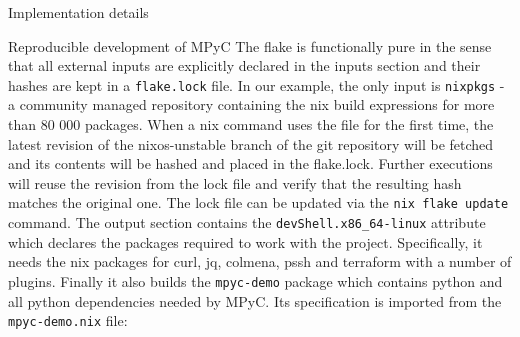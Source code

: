 \begin{frame}[fragile]{Implementation details}
\begin{block}{Reproducible development of MPyC}
The flake is functionally pure in the sense that all external inputs are
explicitly declared in the inputs section and their hashes are kept in a
\texttt{flake.lock} file. In our example, the only input is
\texttt{nixpkgs} - a community managed repository containing the nix
build expressions for more than 80 000 packages. When a nix command uses
the file for the first time, the latest revision of the nixos-unstable
branch of the git repository will be fetched and its contents will be
hashed and placed in the flake.lock. Further executions will reuse the
revision from the lock file and verify that the resulting hash matches
the original one. The lock file can be updated via the
\texttt{nix\ flake\ update} command. The output section contains the
\texttt{devShell.x86\_64-linux} attribute which declares the packages
required to work with the project. Specifically, it needs the nix
packages for curl, jq, colmena, pssh and terraform with a number of
plugins. Finally it also builds the \texttt{mpyc-demo} package which
contains python and all python dependencies needed by MPyC. Its
specification is imported from the \texttt{mpyc-demo.nix} file:

\newpage

\begin{Shaded}
\begin{Highlighting}[]
\OperatorTok{\{} \OperatorTok{,}  \OperatorTok{\}}\NormalTok{:}
\OperatorTok{(}\OperatorTok{\{}
     \OperatorTok{=}\OperatorTok{;}
     \OperatorTok{=}\OperatorTok{;}

     \OperatorTok{=} \OperatorTok{(}\OperatorTok{:} \OperatorTok{[}
      \OperatorTok{(}
        \OperatorTok{\{}
           \OperatorTok{=} \OperatorTok{;}
           \OperatorTok{=}\OperatorTok{;}
        \OperatorTok{\})}
    \OperatorTok{]);}

     \OperatorTok{=}\OperatorTok{(}
      \OperatorTok{:} \OperatorTok{:} \OperatorTok{\{}
         \OperatorTok{=}\OperatorTok{;}
      \OperatorTok{\}}
    \OperatorTok{);}
  \OperatorTok{\})}
\end{Highlighting}
\end{Shaded}


\end{block}
\end{frame}
